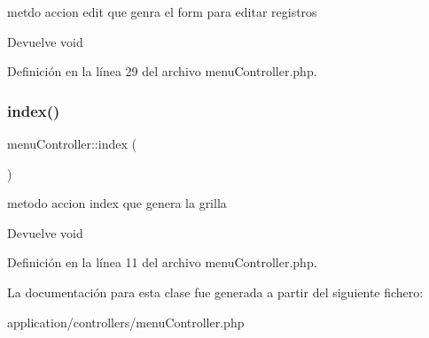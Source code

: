 metdo accion edit que genra el form para editar registros

\begin{DoxyReturn}{Devuelve}
void 
\end{DoxyReturn}


Definición en la línea 29 del archivo menu\+Controller.\+php.

\mbox{\label{classmenu_controller_a2b51402e97607111f6674ca41be2e77a}} 
\subsubsection{\texorpdfstring{index()}{index()}}
{\footnotesize\ttfamily menu\+Controller\+::index (\begin{DoxyParamCaption}{ }\end{DoxyParamCaption})}

metodo accion index que genera la grilla

\begin{DoxyReturn}{Devuelve}
void 
\end{DoxyReturn}


Definición en la línea 11 del archivo menu\+Controller.\+php.



La documentación para esta clase fue generada a partir del siguiente fichero\+:\begin{DoxyCompactItemize}
\item 
application/controllers/menu\+Controller.\+php\end{DoxyCompactItemize}
